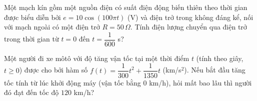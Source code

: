 \begin{bt}%
	Một mạch kín gồm một nguồn điện có suất điện động biến thiên theo thời gian được biểu diễn bởi $e=10\cos (100\pi t)$ (V) và điện trở trong không đáng kể, nối với mạch ngoài có một điện trở $R=50\,\Omega$. Tính  điện lượng chuyển qua điện trở trong thời gian từ $t=0$ đến $t=\dfrac{1}{600}$ s?
\end{bt}

\begin{bt}%
	Một người đi xe môtô với độ tăng vận tốc tại một thời điểm $t$ (tính  theo giây, $t\ge 0$) được cho bởi hàm số $f(t)=\dfrac{1}{300}t^2+\dfrac{1}{1350}t$ (km/s$^2$). Nếu bắt đầu tăng tốc tính từ lúc khởi động máy (vận tốc bằng $0$ km/h), hỏi mất bao lâu thì người đó đạt đến tốc độ $120$ km/h?
\end{bt}

